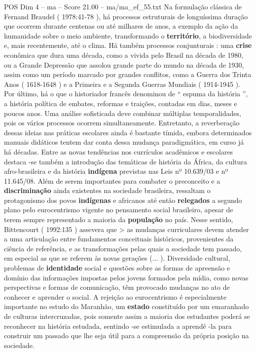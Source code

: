 \begin{textsample}{POS Dim 4 – ma – Score 21.00 – ma/ma\_ef\_55.txt}
Na formulação clássica de Fernand Braudel ( 1978:41-78 ), há processos estruturais de longuíssima duração que ocorrem durante centenas ou até milhares de anos, a exemplo da ação da humanidade sobre o meio ambiente, transformando o \textbf{território}, a biodiversidade e, mais recentemente, até o clima.
Há também processos conjunturais : uma \textbf{crise} econômica que dura uma década, como a vivida pelo Brasil na década de 1980, ou a Grande Depressão que assolou grande parte do mundo na década de 1930, assim como um período marcado por grandes conflitos, como a Guerra dos Trinta Anos ( 1618-1648 ) e a Primeira e a Segunda Guerras Mundiais ( 1914-1945 ).
Por último, há o que o historiador francês denominou de “ espuma da história ”, a história política de embates, reformas e traições, contadas em dias, meses e poucos anos.
Uma análise sofisticada deve combinar múltiplas temporalidades, pois os vários processos ocorrem simultaneamente.
Entretanto, a reverberação dessas ideias nas práticas escolares ainda é bastante tímida, embora determinados manuais didáticos tentem dar conta dessa mudança paradigmática, em curso já há décadas.
Entre as novas tendências nos currículos acadêmicos e escolares destaca -se também a introdução das temáticas de história da África, da cultura afro-brasileira e da história \textbf{indígena} previstas nas Leis nº 10.639/03 e nº 11.645/08.
Além de serem importantes para combater o preconceito e a \textbf{discriminação} ainda existentes na sociedade brasileira, ressaltam o protagonismo dos povos \textbf{indígenas} e africanos até então \textbf{relegados} a segundo plano pelo eurocentrismo vigente no pensamento social brasileiro, apesar de terem sempre representado a maioria da \textbf{população} no país.
Nesse sentido, Bittencourt ( 1992:135 ) assevera que > as mudanças curriculares devem atender a uma articulação entre fundamentos conceituais históricos, provenientes da ciência de referência, e as transformações pelas quais a sociedade tem passado, em especial as que se referem às novas gerações (... ).
Diversidade cultural, problemas de \textbf{identidade} social e questões sobre as formas de apreensão e domínio das informações impostas pelos jovens formados pela mídia, como novas perspectivas e formas de comunicação, têm provocado mudanças no ato de conhecer e aprender o social.
A rejeição ao eurocentrismo é especialmente importante no estudo do Maranhão, um \textbf{estado} constituído por um emaranhado de culturas intercruzadas, pois somente assim a maioria dos estudantes poderá se reconhecer na história estudada, sentindo -se estimulada a aprendê -la para construir um passado que lhe seja útil para a compreensão da própria posição na sociedade.

\end{textsample}
